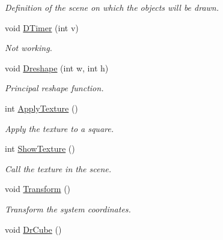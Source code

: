 \begin{DoxyCompactItemize}
\begin{DoxyCompactList}\small\item\em Definition of the scene on which the objects will be drawn. \end{DoxyCompactList}\item 
void \hyperlink{classDraw_a3c4f3df21652856a8394a447d2afa61d}{D\+Timer} (int v)\hypertarget{classDraw_a3c4f3df21652856a8394a447d2afa61d}{}\label{classDraw_a3c4f3df21652856a8394a447d2afa61d}

\begin{DoxyCompactList}\small\item\em Not working. \end{DoxyCompactList}\item 
void \hyperlink{classDraw_a0cd7542f249d2cef85422d5ae63de96a}{Dreshape} (int w, int h)\hypertarget{classDraw_a0cd7542f249d2cef85422d5ae63de96a}{}\label{classDraw_a0cd7542f249d2cef85422d5ae63de96a}

\begin{DoxyCompactList}\small\item\em Principal reshape function. \end{DoxyCompactList}\item 
int \hyperlink{classDraw_a109d40d540116a12e8fe6b88dcd1ec89}{Apply\+Texture} ()\hypertarget{classDraw_a109d40d540116a12e8fe6b88dcd1ec89}{}\label{classDraw_a109d40d540116a12e8fe6b88dcd1ec89}

\begin{DoxyCompactList}\small\item\em Apply the texture to a square. \end{DoxyCompactList}\item 
int \hyperlink{classDraw_ab319e761c351a70537cda32d33f63098}{Show\+Texture} ()\hypertarget{classDraw_ab319e761c351a70537cda32d33f63098}{}\label{classDraw_ab319e761c351a70537cda32d33f63098}

\begin{DoxyCompactList}\small\item\em Call the texture in the scene. \end{DoxyCompactList}\item 
void \hyperlink{classDraw_a26cd1ca797b17da835a5d2050c6dda2f}{Transform} ()\hypertarget{classDraw_a26cd1ca797b17da835a5d2050c6dda2f}{}\label{classDraw_a26cd1ca797b17da835a5d2050c6dda2f}

\begin{DoxyCompactList}\small\item\em Transform the system coordinates. \end{DoxyCompactList}\item 
void \hyperlink{classDraw_ae391a0fc7ddb11d90732dd74249f5fe7}{Dr\+Cube} ()\hypertarget{classDraw_ae391a0fc7ddb11d90732dd74249f5fe7}{}\label{classDraw_ae391a0fc7ddb11d90732dd74249f5fe7}


\end{DoxyCompactItemize}
